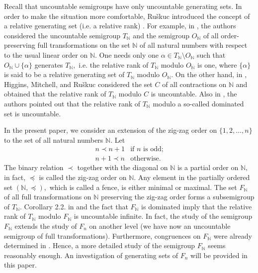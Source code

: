 \documentclass[11pt]{article}
\theoremstyle{plain}
\theoremstyle{definition}
\begin{document}
Recall that uncountable semigroups have only uncountable generating sets. In order to make the situation more comfortable, Ru\v{s}kuc introduced the concept of a relative generating set (i.e. a relative rank) \cite{Firstgen}. For example, in \cite{J,K}, the authors considered the uncountable semigroup $T_{\mathbb{N}}$ and the semigroup $O_{\mathbb{N}}$ of all order-preserving full transformations on the set $\mathbb{N}$ of all natural numbers with respect to the usual linear order on $\mathbb{N}.$ One needs only one $\alpha\in T_{\mathbb{N}}\setminus O_{\mathbb{N}}$ such that $O_{\mathbb{N}}\cup \{\alpha\}$ generates $T_{\mathbb{N}},$ i.e. the relative rank of $T_{\mathbb{N}}$ modulo $O_{\mathbb{N}}$ is one, where $\{\alpha\}$ is said to be a relative generating set of $T_{\mathbb{N}}$ modulo $O_{\mathbb{N}}.$ On the other hand, in \cite{K}, Higgins, Mitchell, and Ru\v{s}kuc considered the set $C$ of all contractions on $\mathbb{N}$ and obtained that the relative rank of $T_{\mathbb{N}}$ modulo $C$ is uncountable. Also in \cite{K}, the authors pointed out that  the relative rank of $T_{\mathbb{N}}$ modulo a so-called dominated set is uncountable. 

In the present paper, we consider an extension of the zig-zag order on $\{1,2,\ldots,n\}$ to the set of all natural numbers $\mathbb{N}$. Let
\[
\begin{array}{ccc}
n\prec n+1 & \text{if } n\text{ is odd;} \\ 
n+1\prec n & \text{otherwise.}%
\end{array}%
\]%
The binary relation $\prec$ together with the diagonal on $\mathbb{N}$ is a partial order on $\mathbb{N},$ in fact, $\preceq$ is called the zig-zag order on $\mathbb{N}.$ Any element in the partially ordered set $(\mathbb{N},\preceq),$ which is called a fence, is either minimal or maximal. The set $F_{\mathbb{N}}$ of all full transformations on $\mathbb{N}$ preserving the zig-zag order forms a subsemigroup of $T_{\mathbb{N}}.$ Corollary 2.2. in \cite{K} and the fact that $F_{\mathbb{N}}$ is dominated imply that the relative rank of $T_{\mathbb{N}}$ modulo $F_{\mathbb{N}}$ is uncountable infinite. In fact, the study of the semigroup $F_{\mathbb{N}}$ extends the study of $F_{n}$ on another level (we have now an uncountable semigroup of full transformations). Furthermore, congruences on $F_{\mathbb{N}}$ were already determined in \cite{Lohapan}. Hence, a more detailed study of the semigroup $F_{\mathbb{N}}$ seems reasonably enough. An investigation of generating sets of $F_{n}$ will be provided in this paper.
\end{document}
